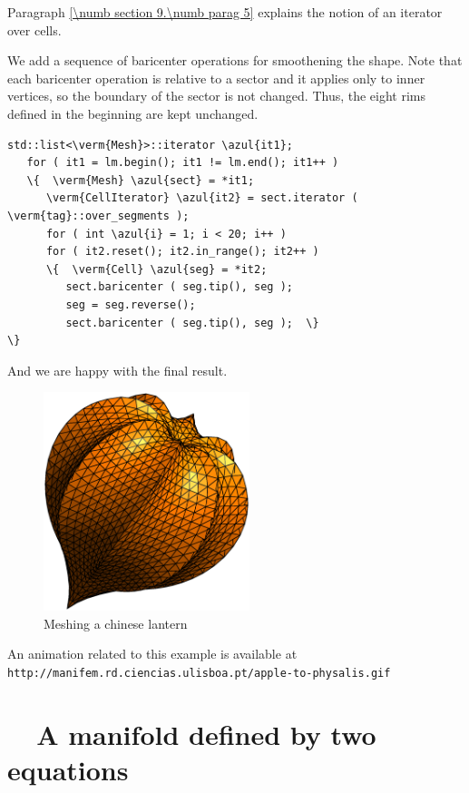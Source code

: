 Paragraph \ref{\numb section 9.\numb parag 5} explains the notion of an iterator over cells.

We add a sequence of baricenter operations for smoothening the shape.
Note that each baricenter operation is relative to a sector and it applies only to inner
vertices, so the boundary of the sector is not changed.
Thus, the eight rims defined in the beginning are kept unchanged.

\begin{Verbatim}[commandchars=\\\{\},formatcom=\small\tt,frame=single,
   label=parag-\ref{\numb section 2.\numb parag 10}.cpp,rulecolor=\color{coment},
   baselinestretch=0.94,framesep=2mm]
   std::list<\verm{Mesh}>::iterator \azul{it1};
   for ( it1 = lm.begin(); it1 != lm.end(); it1++ )
   \{  \verm{Mesh} \azul{sect} = *it1;
      \verm{CellIterator} \azul{it2} = sect.iterator ( \verm{tag}::over_segments );
      for ( int \azul{i} = 1; i < 20; i++ )
      for ( it2.reset(); it2.in_range(); it2++ )
      \{  \verm{Cell} \azul{seg} = *it2;
         sect.baricenter ( seg.tip(), seg );
         seg = seg.reverse();
         sect.baricenter ( seg.tip(), seg );  \}                     \}
\end{Verbatim}

And we are happy with the final result.

\begin{figure} \centering
  \includegraphics[width=60mm]{fisalis}
  \caption{Meshing a chinese lantern}
  \label{\numb section 2.\numb fig 13}
\end{figure}

An animation related to this example is available at\hfil\break
{\small\tt http://manifem.rd.ciencias.ulisboa.pt/apple-to-physalis.gif}


\section{~~A manifold defined by two equations}\label{\numb section 2.\numb parag 11}

